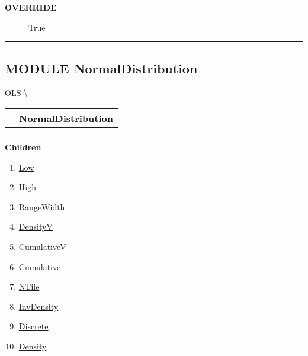 \par

\par
\begin{description}
\item [\colorbox{tagtype}{\color{white} \textbf{\textsf{OVERRIDE}}}] \textbf{\underline{}} True
\end{description}

\rule{\linewidth}{0.5pt}


\subsection*{\textsf{\colorbox{headtoc}{\color{white} MODULE}
NormalDistribution}}

\hypertarget{ecldoc:linearregression.ols.normaldistribution}{}
\hspace{0pt} \hyperlink{ecldoc:linearregression.ols}{OLS} \textbackslash 

{\renewcommand{\arraystretch}{1.5}
\begin{tabularx}{\textwidth}{|>{\raggedright\arraybackslash}l|X|}
\hline
\hspace{0pt}\mytexttt{\color{red} } & \textbf{NormalDistribution} \\
\hline
\multicolumn{2}{|>{\raggedright\arraybackslash}X|}{\hspace{0pt}\mytexttt{\color{param} (t\_Count NRanges)}} \\
\hline
\end{tabularx}
}

\par


\textbf{Children}
\begin{enumerate}
\item \hyperlink{ecldoc:linearregression.ols.distributionbase.low}{Low}
\item \hyperlink{ecldoc:linearregression.ols.distributionbase.high}{High}
\item \hyperlink{ecldoc:linearregression.ols.distributionbase.rangewidth}{RangeWidth}
\item \hyperlink{ecldoc:linearregression.ols.distributionbase.densityv}{DensityV}
\item \hyperlink{ecldoc:linearregression.ols.distributionbase.cumulativev}{CumulativeV}
\item \hyperlink{ecldoc:linearregression.ols.distributionbase.cumulative}{Cumulative}
\item \hyperlink{ecldoc:linearregression.ols.distributionbase.ntile}{NTile}
\item \hyperlink{ecldoc:linearregression.ols.distributionbase.invdensity}{InvDensity}
\item \hyperlink{ecldoc:linearregression.ols.distributionbase.discrete}{Discrete}
\item \hyperlink{ecldoc:linearregression.ols.normaldistribution.density}{Density}
\end{enumerate}

